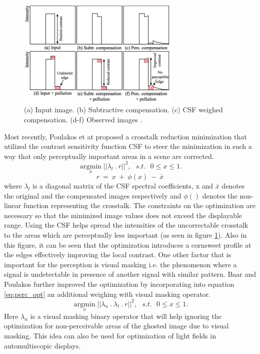 \begin{figure}
\centering
    \includegraphics[width=0.7\textwidth]{./Template_Figures/perceptual_ct}
    \caption{(a) Input image. (b) Subtractive compensation. (c) CSF weighed compensation. (d-f) Observed images \cite{van2011perceptually}.\label{fig:perc_opt}}
\end{figure}
 Most recently, Poulakos et at \cite{van2011perceptually} proposed a crosstalk reduction minimization that utilized the contrast sensitivity function CSF to steer the minimization in such a way that only perceptually important areas in a scene are corrected.
 \begin{equation}
\underset{x}{\operatorname{argmin}}||\lambda_l \: . \: r||^2, \:\:\: s.t. \:\:\: 0 \leq x \leq 1.
\label{eq:perc_opt}
\end{equation}
\begin{equation}
r\: = \: x\: + \: \phi(x)\: - \: \bar{x}
\label{eq:residual_eq}
\end{equation}
where $\lambda_l$ is a diagonal matrix of the CSF spectral coefficients, x and $\bar{x}$ denotes the original and the compensated images respectively and $\phi()$ denotes the non-linear function representing the crosstalk. The constraints on the optimization are necessary so that the minimized image values does not exceed the displayable range. Using the CSF helps spread the intensities of the uncorrectable crosstalk to the areas which are perceptually less important (as seen in figure \ref{fig:perc_opt}). Also in this figure, it can be seen that the optimization introduces a cornsweet profile at the edges effectively improving the local contrast. One other factor that is important for the perception is visual masking i.e. the phenomenon where a signal is undetectable in presence of another signal with similar pattern. Baar and Poulakos further improved the optimization by incorporating into equation \ref{eq:perc_opt} an additional weighing with visual masking operator.
\begin{equation}
\underset{x}{\operatorname{argmin}}||\lambda_n\:.\:\lambda_l \: . \: r||^2, \:\:\: s.t. \:\:\: 0 \leq x \leq 1.
\label{eq:perc_opt_vm}
\end{equation}
Here $\lambda_n$ is a visual masking binary operator that will help ignoring the optimization for non-perceivable areas of the ghosted image due to visual masking. This idea can also be used for optimization of light fields in automultiscopic displays.

